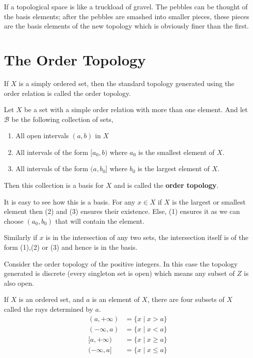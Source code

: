 \begin{remark}
    If a topological space is like a truckload of gravel. The pebbles can be thought of the basis elements; after the pebbles are smashed into smaller pieces, these pieces are the basis elements of the new topology which is obviously finer than the first.
\end{remark}

\section{The Order Topology}
If $X$ is a simply ordered set, then the standard topology generated using the order relation is called the order topology.

\vspace{1em}

\begin{definition}
    Let $X$ be a set with a simple order relation with more than one element. And let $\mathcal{B}$ be the following collection of sets,
    \begin{enumerate}
        \item All open intervals $(a,b)$ in $X$
        \item All intervals of the form $[a_{0}, b)$ where $a_{0}$ is the smallest element of $X$.
        \item All intervals of the form $(a, b_{0}]$ where $b_{0}$ is the largest element of $X$.
    \end{enumerate}

    Then this collection is a basis for $X$ and is called the \textbf{order topology}.
\end{definition}
\begin{remark}
    It is easy to see how this is a basis. For any $x \in X$ if $X$ is the largest or smallest element then (2) and (3) ensures their existence. Else, (1) ensures it as we can choose $(a_{0},b_{0})$ that will contain the element.

    \vspace{1em}
    
    Similarly if $x$ is in the intersection of any two sets, the intersection itself is of the form (1),(2) or (3) and hence is in the basis.
\end{remark}

\begin{eg}
    Consider the order topology of the positive integers. In this case the topology generated is discrete (every singleton set is open) which means any subset of $Z$ is also open.
\end{eg}
\begin{definition}
If $X$ is an ordered set, and $a$ is an element of $X$, there are four subsets of $X$ called the rays determined by $a$.
\begin{align*}
    (a, +\infty) &= \{x \mid x > a\}\\
    (-\infty, a) &= \{x \mid x < a\}\\
    [a, +\infty) &= \{x \mid x \ge a\}\\
    (-\infty, a] &= \{x \mid x \le a\}\\
\end{align*}
\end{definition}

